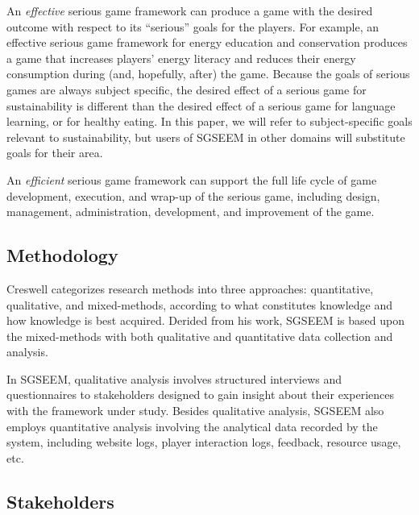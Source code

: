\documentclass{sigchi}
\begin{document}
An \emph{effective} serious game framework can produce a game with the desired outcome
with respect to its ``serious'' goals for the players. For example, an effective serious
game framework for energy education and conservation produces a game that increases
players' energy literacy and reduces their energy consumption during (and, hopefully,
after) the game. Because the goals of serious games are always subject specific, the
desired effect of a serious game for sustainability is different than the desired effect
of a serious game for language learning, or for healthy eating.  In this paper, we will 
refer to subject-specific goals relevant to sustainability, but users of SGSEEM in other
domains will substitute goals for their area. 

An \emph{efficient} serious game framework can support the
full life cycle of game development, execution, and wrap-up of the
serious game, including design, management, administration, development,
and improvement of the game.

\subsection{Methodology}


Creswell \cite{creswell2003} categorizes research methods into three approaches:
quantitative, qualitative, and mixed-methods, according to what constitutes knowledge
and how knowledge is best acquired. Derided from his work, SGSEEM is based upon the mixed-methods with both qualitative and quantitative data collection and analysis.


In SGSEEM, qualitative analysis involves structured interviews and questionnaires to stakeholders designed to gain insight about their experiences with the
framework under study. Besides qualitative analysis, SGSEEM also employs quantitative analysis involving the analytical data recorded by the system, including website logs, player interaction logs, feedback, resource usage, etc.

\subsection{Stakeholders}
\end{document}
